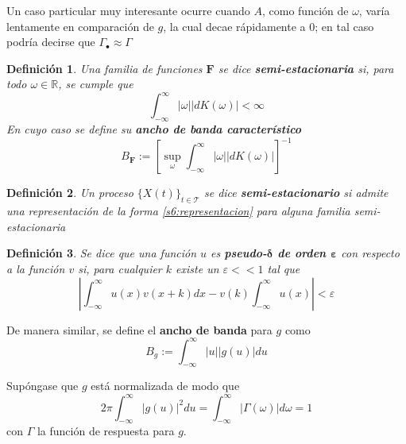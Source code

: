 \documentclass[12pt,letterpaper,draft]{book}
\newtheorem{definicion}{Definición}[chapter]
\newcommand{\R}{\mathbb{R}}
\newcommand{\intR}{\int_{-\infty}^{\infty}}
\newcommand{\ef}{\mathbf{F}}
\newcommand{\abso}[1]{\left| #1 \right|}
\newcommand{\xt}{$\{X(t)\}_{t\in \mathcal{T}}$ }
\begin{document}
Un caso particular muy interesante ocurre cuando $A$, como función de $\omega$, varía lentamente en comparación de $g$, la cual decae rápidamente a 0; en tal caso podría decirse que $\Gamma_\bullet \approx \Gamma$

\begin{definicion}
Una familia de funciones $\ef$ se dice \textbf{semi-estacionaria} si, para todo $\omega \in \R$, se cumple que
\begin{equation}
\intR \abso{\omega} \abso{dK(\omega)} < \infty
\end{equation}
En cuyo caso se define su \textbf{ancho de banda característico}
\begin{equation}
B_\ef := \left[ \sup_\omega \intR \abso{\omega} \abso{dK(\omega)} \right]^{-1}
\end{equation}
\end{definicion}

\begin{definicion}
Un proceso \xt se dice \textbf{semi-estacionario} si admite una representación de la forma \ref{s6:representacion} para alguna familia semi-estacionaria
\end{definicion}


\begin{definicion}
Se dice que una función $u$ es 
\textbf{pseudo-$\boldsymbol{\delta}$ de orden $\boldsymbol{\varepsilon}$} con respecto a la función $v$ si, para cualquier $k$ existe un $\varepsilon << 1$ tal que 
\begin{equation}
\abso{\intR u(x) v(x+k) dx  -  v(k)\intR u(x)} < \varepsilon
\end{equation}
\end{definicion}

De manera similar, se define el \textbf{ancho de banda} para $g$ como 
\begin{equation}
B_g := \intR \abso{u} \abso{g(u)} du
\end{equation}

Supóngase que $g$ está normalizada de modo que
\begin{equation}
2 \pi \intR \abso{g(u)}^{2} du = \intR \abso{\Gamma(\omega)} d\omega = 1
\label{s6:norm_g}
\end{equation}
con $\Gamma$ la función de respuesta para $g$.
\end{document}
